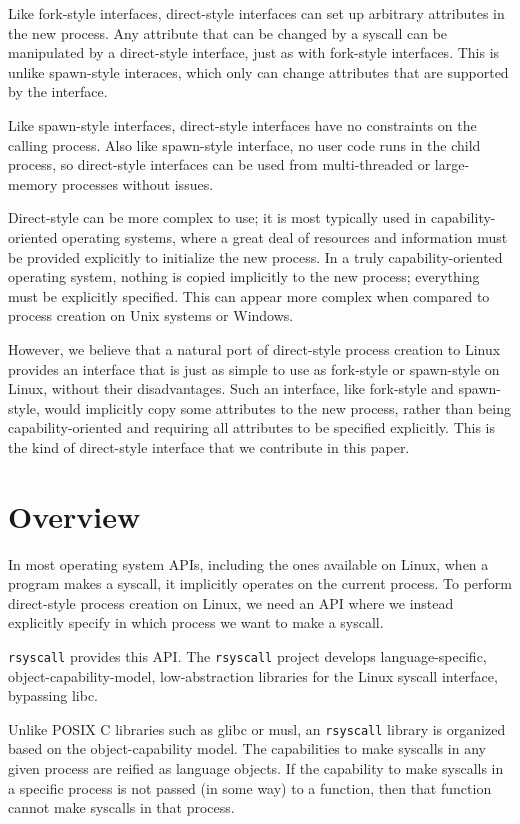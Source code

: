 \documentclass[sigplan]{acmart}
\begin{document}
Like fork-style interfaces,
direct-style interfaces can set up arbitrary attributes in the new process.
Any attribute that can be changed by a syscall
can be manipulated by a direct-style interface,
just as with fork-style interfaces.
This is unlike spawn-style interaces,
which only can change attributes that are supported by the interface.

Like spawn-style interfaces,
direct-style interfaces have no constraints on the calling process.
Also like spawn-style interface,
no user code runs in the child process, so
direct-style interfaces can be used from multi-threaded or large-memory processes without issues.

Direct-style can be more complex to use;
it is most typically used in capability-oriented operating systems,
where a great deal of resources and information must be provided explicitly to initialize the new process.
In a truly capability-oriented operating system,
nothing is copied implicitly to the new process;
everything must be explicitly specified.
This can appear more complex
when compared to process creation on Unix systems or Windows.

However, we believe that a natural port of direct-style process creation to Linux
provides an interface that is just as simple to use as fork-style or spawn-style on Linux,
without their disadvantages.
Such an interface, like fork-style and spawn-style,
would implicitly copy some attributes to the new process,
rather than being capability-oriented and requiring all attributes to be specified explicitly.
This is the kind of direct-style interface that we contribute in this paper.
\section{Overview}\label{overview}
In most operating system APIs, including the ones available on Linux,
when a program makes a syscall, it implicitly operates on the current process.
To perform direct-style process creation on Linux,
we need an API where we instead explicitly specify in which process we want to make a syscall.

\texttt{rsyscall} provides this API.
The \texttt{rsyscall} project develops
language-specific, object-capability-model, low-abstraction libraries for the Linux syscall interface,
bypassing libc.

Unlike POSIX C libraries such as glibc or musl,
an \texttt{rsyscall} library is organized based on the object-capability model.
The capabilities to make syscalls in any given process are reified as language objects.
If the capability to make syscalls in a specific process is not passed (in some way) to a function,
then that function cannot make syscalls in that process.
\end{document}
